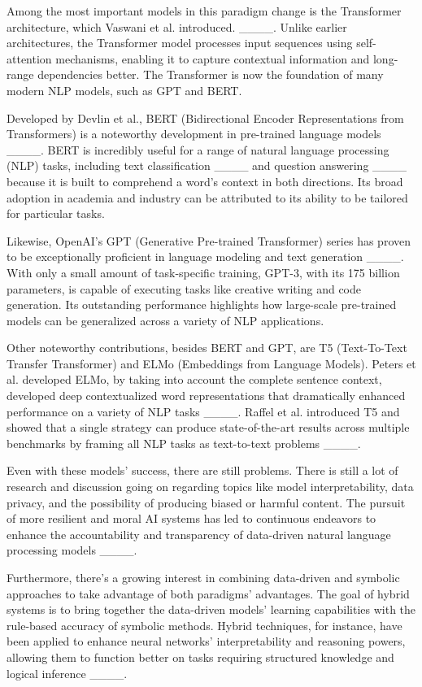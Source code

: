 Among the most important models in this paradigm change is the Transformer architecture, which Vaswani et al. introduced. ____. Unlike earlier architectures, the Transformer model processes input sequences using self-attention mechanisms, enabling it to capture contextual information and long-range dependencies better. The Transformer is now the foundation of many modern NLP models, such as GPT and BERT.

Developed by Devlin et al., BERT (Bidirectional Encoder Representations from Transformers) is a noteworthy development in pre-trained language models ____. BERT is incredibly useful for a range of natural language processing (NLP) tasks, including text classification ____ and question answering ____ because it is built to comprehend a word's context in both directions. Its broad adoption in academia and industry can be attributed to its ability to be tailored for particular tasks. 

Likewise, OpenAI's GPT (Generative Pre-trained Transformer) series has proven to be exceptionally proficient in language modeling and text generation ____. With only a small amount of task-specific training, GPT-3, with its 175 billion parameters, is capable of executing tasks like creative writing and code generation. Its outstanding performance highlights how large-scale pre-trained models can be generalized across a variety of NLP applications.

Other noteworthy contributions, besides BERT and GPT, are T5 (Text-To-Text Transfer Transformer) and ELMo (Embeddings from Language Models). Peters et al. developed ELMo, by taking into account the complete sentence context, developed deep contextualized word representations that dramatically enhanced performance on a variety of NLP tasks ____. Raffel et al. introduced T5 and showed that a single strategy can produce state-of-the-art results across multiple benchmarks by framing all NLP tasks as text-to-text problems ____. 

Even with these models' success, there are still problems. There is still a lot of research and discussion going on regarding topics like model interpretability, data privacy, and the possibility of producing biased or harmful content. The pursuit of more resilient and moral AI systems has led to continuous endeavors to enhance the accountability and transparency of data-driven natural language processing models ____.

Furthermore, there's a growing interest in combining data-driven and symbolic approaches to take advantage of both paradigms' advantages. The goal of hybrid systems is to bring together the data-driven models' learning capabilities with the rule-based accuracy of symbolic methods. Hybrid techniques, for instance, have been applied to enhance neural networks' interpretability and reasoning powers, allowing them to function better on tasks requiring structured knowledge and logical inference ____.

